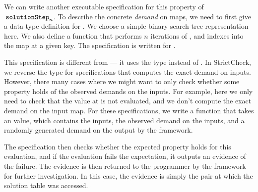 \documentclass[acmsmall,review]{acmart}\settopmatter{}
\begin{document}
We can write another executable specification for this property of
$\lk{solutionStep}_n$. To describe the concrete \textit{demand} on
maps, we need to first give a data type definition for . We
choose a simple binary search tree representation here. We also define
a function  that performs $n$ iterations
of , and indexes into the map at a given key. The
specification is written for .
%
%
This specification is different from  --- it uses
the  type instead of . In StrictCheck, we
reverse the  type for specifications that computes the exact
demand on inputs. However, there many cases where we might want to
only check whether some property holds of the observed demands on the
inputs. For example, here we only need to check that the value
at  is not evaluated, and we don't compute the exact demand
on the input map. For these specifications, we write a function that
takes an  value, which contains the inputs, the
observed demand on the inputs, and a randomly generated demand on the
output by the framework.

The specification then checks whether the expected property holds for
this evaluation, and if the evaluation fails the expectation, it
outputs an evidence of the failure. The evidence is then returned to
the programmer by the framework for further investigation. In this
case, the evidence is simply the  pair at which the
solution table was accessed.
\end{document}
